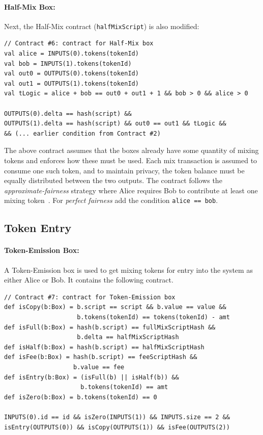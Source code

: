 \documentclass[runningheads]{llncs}
\begin{document}
\paragraph{Half-Mix Box:}
Next, the Half-Mix contract (\texttt{halfMixScript}) is also modified:
{\small
\begin{Verbatim}[frame=single]
// Contract #6: contract for Half-Mix box
val alice = INPUTS(0).tokens(tokenId)
val bob = INPUTS(1).tokens(tokenId)
val out0 = OUTPUTS(0).tokens(tokenId)
val out1 = OUTPUTS(1).tokens(tokenId)
val tLogic = alice + bob == out0 + out1 + 1 && bob > 0 && alice > 0 
  
OUTPUTS(0).delta == hash(script) && 
OUTPUTS(1).delta == hash(script) && out0 == out1 && tLogic &&
&& (... earlier condition from Contract #2)
\end{Verbatim}
}

The above contract assumes that the boxes already have some quantity of mixing tokens and enforces how these must be used. Each mix transaction is assumed to consume one such token, and to maintain privacy, the token balance must be equally distributed between the two outputs. The contract follows the {\em approximate-fairness} strategy where Alice requires Bob to contribute at least one mixing token~\cite{advtutorial}. For {\em perfect fairness} add the condition \texttt{alice == bob}. 

\subsection{Token Entry}

\paragraph{Token-Emission Box:} A Token-Emission box is used to get mixing tokens for entry into the system as either Alice or Bob. It contains the following contract. 

{\small
\begin{Verbatim}[frame=single]
// Contract #7: contract for Token-Emission box
def isCopy(b:Box) = b.script == script && b.value == value &&
                    b.tokens(tokenId) == tokens(tokenId) - amt
def isFull(b:Box) = hash(b.script) == fullMixScriptHash && 
                    b.delta == halfMixScriptHash
def isHalf(b:Box) = hash(b.script) == halfMixScriptHash
def isFee(b:Box) = hash(b.script) == feeScriptHash &&
                   b.value == fee
def isEntry(b:Box) = (isFull(b) || isHalf(b)) && 
                     b.tokens(tokenId) == amt
def isZero(b:Box) = b.tokens(tokenId) == 0

INPUTS(0).id == id && isZero(INPUTS(1)) && INPUTS.size == 2 &&
isEntry(OUTPUTS(0)) && isCopy(OUTPUTS(1)) && isFee(OUTPUTS(2))
\end{Verbatim}
}
\end{document}
